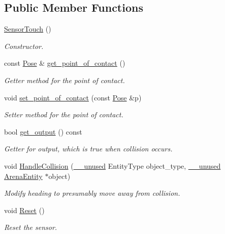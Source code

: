 \subsection*{Public Member Functions}
\begin{DoxyCompactItemize}
\item 
\hyperlink{classSensorTouch_ab8e0dc693ec2fbc1aa5ff25ee2bfdb19}{Sensor\+Touch} ()\hypertarget{classSensorTouch_ab8e0dc693ec2fbc1aa5ff25ee2bfdb19}{}\label{classSensorTouch_ab8e0dc693ec2fbc1aa5ff25ee2bfdb19}

\begin{DoxyCompactList}\small\item\em Constructor. \end{DoxyCompactList}\item 
const \hyperlink{structPose}{Pose} \& \hyperlink{classSensorTouch_a9f56fd943758125611863ce2bc0d9365}{get\+\_\+point\+\_\+of\+\_\+contact} ()
\begin{DoxyCompactList}\small\item\em Getter method for the point of contact. \end{DoxyCompactList}\item 
void \hyperlink{classSensorTouch_a2ef6d89a8e763e21f82e03a3033a490f}{set\+\_\+point\+\_\+of\+\_\+contact} (const \hyperlink{structPose}{Pose} \&p)
\begin{DoxyCompactList}\small\item\em Setter method for the point of contact. \end{DoxyCompactList}\item 
bool \hyperlink{classSensorTouch_a6a2f77ea46d008f4a058bfb24db742e0}{get\+\_\+output} () const \hypertarget{classSensorTouch_a6a2f77ea46d008f4a058bfb24db742e0}{}\label{classSensorTouch_a6a2f77ea46d008f4a058bfb24db742e0}

\begin{DoxyCompactList}\small\item\em Getter for output, which is true when collision occurs. \end{DoxyCompactList}\item 
void \hyperlink{classSensorTouch_a1980b126f7c6d0e6bdf75f1bb59fe5c2}{Handle\+Collision} (\hyperlink{common_8h_a2e3484535ee610c8e19e9859563abe48}{\+\_\+\+\_\+unused} Entity\+Type object\+\_\+type, \hyperlink{common_8h_a2e3484535ee610c8e19e9859563abe48}{\+\_\+\+\_\+unused} \hyperlink{classArenaEntity}{Arena\+Entity} $\ast$object)
\begin{DoxyCompactList}\small\item\em Modify heading to presumably move away from collision. \end{DoxyCompactList}\item 
void \hyperlink{classSensorTouch_ad0054916c97844a51052e5dee63f68b9}{Reset} ()\hypertarget{classSensorTouch_ad0054916c97844a51052e5dee63f68b9}{}\label{classSensorTouch_ad0054916c97844a51052e5dee63f68b9}

\begin{DoxyCompactList}\small\item\em Reset the sensor. \end{DoxyCompactList}\end{DoxyCompactItemize}


